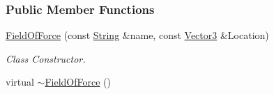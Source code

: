 \subsubsection*{Public Member Functions}
\begin{DoxyCompactItemize}
\item 
\hyperlink{classMezzanine_1_1FieldOfForce_aa212c5cde10986e1d511a3843af9428c}{FieldOfForce} (const \hyperlink{namespaceMezzanine_acf9fcc130e6ebf08e3d8491aebcf1c86}{String} \&name, const \hyperlink{classMezzanine_1_1Vector3}{Vector3} \&Location)
\begin{DoxyCompactList}\small\item\em Class Constructor. \item\end{DoxyCompactList}\item 
\hypertarget{classMezzanine_1_1FieldOfForce_ae9d68bc47f8598fd764b4ed9ae28a89c}{
virtual \hyperlink{classMezzanine_1_1FieldOfForce_ae9d68bc47f8598fd764b4ed9ae28a89c}{$\sim$FieldOfForce} ()}
\label{classMezzanine_1_1FieldOfForce_ae9d68bc47f8598fd764b4ed9ae28a89c}


\end{DoxyCompactItemize}
